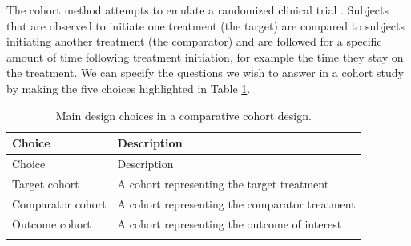 \documentclass[11pt]{book}
\theoremstyle{definition}
\theoremstyle{definition}
\theoremstyle{definition}
\theoremstyle{remark}
\begin{document}
The cohort method attempts to emulate a randomized clinical trial \citep{hernan_2016}. Subjects that are observed to initiate one treatment (the target) are compared to subjects initiating another treatment (the comparator) and are followed for a specific amount of time following treatment initiation, for example the time they stay on the treatment. We can specify the questions we wish to answer in a cohort study by making the five choices highlighted in Table \ref{tab:cmChoices}.

\begin{longtable}[]{@{}ll@{}}
\caption{\label{tab:cmChoices} Main design choices in a comparative cohort design.}\tabularnewline
\toprule
\begin{minipage}[b]{0.23\columnwidth}\raggedright
Choice\strut
\end{minipage} & \begin{minipage}[b]{0.72\columnwidth}\raggedright
Description\strut
\end{minipage}\tabularnewline
\midrule
\endfirsthead
\toprule
\begin{minipage}[b]{0.23\columnwidth}\raggedright
Choice\strut
\end{minipage} & \begin{minipage}[b]{0.72\columnwidth}\raggedright
Description\strut
\end{minipage}\tabularnewline
\midrule
\endhead
\begin{minipage}[t]{0.23\columnwidth}\raggedright
Target cohort\strut
\end{minipage} & \begin{minipage}[t]{0.72\columnwidth}\raggedright
A cohort representing the target treatment\strut
\end{minipage}\tabularnewline
\begin{minipage}[t]{0.23\columnwidth}\raggedright
Comparator cohort\strut
\end{minipage} & \begin{minipage}[t]{0.72\columnwidth}\raggedright
A cohort representing the comparator treatment\strut
\end{minipage}\tabularnewline
\begin{minipage}[t]{0.23\columnwidth}\raggedright
Outcome cohort\strut
\end{minipage} & \begin{minipage}[t]{0.72\columnwidth}\raggedright
A cohort representing the outcome of interest\strut
\end{minipage}\tabularnewline
\begin{minipage}[t]{0.23\columnwidth}\raggedright

\end{minipage}
\end{longtable}
\end{document}
